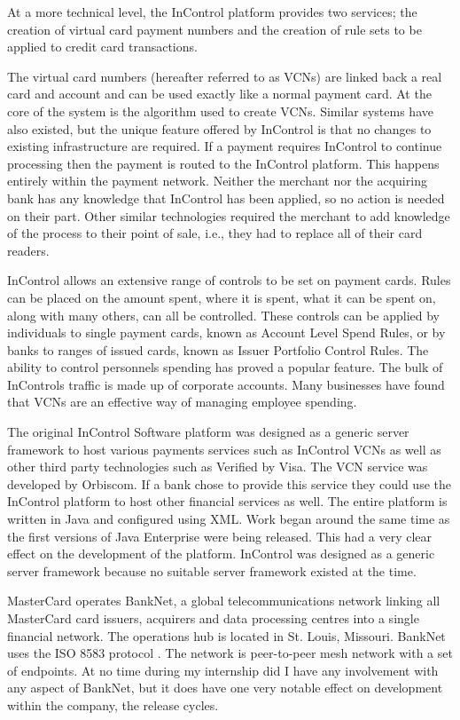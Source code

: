 \documentclass[a4paper, 11pt, titlepage]{article}
\begin{document}
At a more technical level, the InControl platform provides two services; the creation of virtual card payment numbers and the creation of rule sets to be applied to credit card transactions. 
 
The virtual card numbers (hereafter referred to as VCNs) are linked back a real card and account and can be used exactly like a normal payment card. At the core of the system is the algorithm used to create VCNs. Similar systems have also existed, but the unique feature offered by InControl is that no changes to existing infrastructure are required. If a payment requires InControl to continue processing then the payment is routed to the InControl platform. This happens entirely within the payment network. Neither the merchant nor the acquiring bank has any knowledge that InControl has been applied, so no action is needed on their part. Other similar technologies required the merchant to add knowledge of the process to their point of sale, i.e., they had to replace all of their card readers. 
 
InControl allows an extensive range of controls to be set on payment cards. Rules can be placed on the amount spent, where it is spent, what it can be spent on, along with many others, can all be controlled. These controls can be applied by individuals to single payment cards, known as Account Level Spend Rules, or by banks to ranges of issued cards, known as Issuer Portfolio Control Rules. The ability to control personnels spending has proved a popular feature. The bulk of InControls traffic is made up of corporate accounts. Many businesses have found that VCNs are an effective way of managing employee spending.  
 
The original InControl Software platform was designed as a generic server framework to host various payments services such as InControl VCNs as well as other third party technologies such as Verified by Visa. The VCN service was developed by Orbiscom. If a bank chose to provide this service they could use the InControl platform to host other financial services as well. The entire platform is written in Java and configured using XML. Work began around the same time as the first versions of Java Enterprise were being released. This had a very clear effect on the development of the platform. InControl was designed as a generic server framework because no suitable server framework existed at the time. 
 
MasterCard operates BankNet, a global telecommunications network linking all MasterCard card issuers, acquirers and data processing centres into a single financial network. The operations hub is located in St. Louis, Missouri. BankNet uses the ISO 8583 protocol \cite{ISO8583}. The network is peer-to-peer mesh network with a set of endpoints. At no time during my internship did I have any involvement with any aspect of BankNet, but it does have one very notable effect on development within the company, the release cycles.
\end{document}
